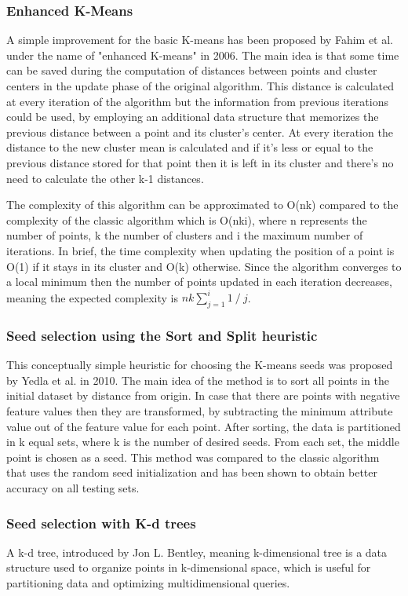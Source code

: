 \documentclass[12pt]{article}
\begin{document}
	\subsubsection{Enhanced K-Means}
	A simple improvement for the basic K-means has been proposed by Fahim et al.\cite{EfficientEnhancedKmeans} under the name of "enhanced K-means" in 2006. The main idea is that some time can be saved during the computation of distances between points and cluster centers in the update phase of the original algorithm. This distance is calculated at every iteration of the algorithm but the information from previous iterations could be used, by employing an additional data structure that memorizes the previous distance between a point and its cluster's center. At every iteration the distance to the new cluster mean is calculated and if it's less or equal to the previous distance stored for that point then it is left in its cluster and there's no need to calculate the other k-1 distances.
	
	The complexity of this algorithm can be approximated to O(nk) compared to the complexity of the classic algorithm which is O(nki), where n represents the number of points, k the number of clusters and i the maximum number of iterations. In brief, the time complexity when updating the position of a point is O(1) if it stays in its cluster and O(k) otherwise. Since the algorithm converges to a local minimum then the number of points updated in each iteration decreases, meaning the expected complexity is \( nk\sum_{j=1}^{i}1\mathbin{/}j \).
	
	\subsubsection{Seed selection using the Sort and Split heuristic}
	This conceptually simple heuristic for choosing the K-means seeds was proposed by Yedla et al.\cite{SortSeed} in 2010. The main idea of the method is to sort all points in the initial dataset by distance from origin. In case that there are points with negative feature values then they are transformed, by subtracting the minimum attribute value out of the feature value for each point. After sorting, the data is partitioned in k equal sets, where k is the number of desired seeds. From each set, the middle point is chosen as a seed. This method was compared to the classic algorithm that uses the random seed initialization and has been shown to obtain better accuracy on all testing sets.
	
	\subsubsection{Seed selection with K-d trees}
	A k-d tree, introduced by Jon L. Bentley\cite{KdTree}, meaning k-dimensional tree is a data structure used to organize points in k-dimensional space, which is useful for partitioning data and optimizing multidimensional queries.
	
\end{document}
